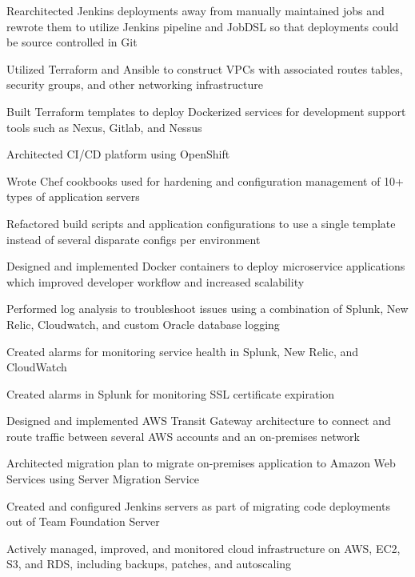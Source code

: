 \begin{cventries}
{\begin{cvitems}
        \item {Rearchitected Jenkins deployments away from manually maintained jobs and rewrote them to utilize Jenkins pipeline and JobDSL so that deployments could be source controlled in Git}
        \item {Utilized Terraform and Ansible to construct VPCs with associated routes tables, security groups, and other networking infrastructure}
        \item {Built Terraform templates to deploy Dockerized services for development support tools such as Nexus, Gitlab, and Nessus}
        \item {Architected CI/CD platform using OpenShift}
        \item {Wrote Chef cookbooks used for hardening and configuration management of 10+ types of application servers}
        \item {Refactored build scripts and application configurations to use a single template instead of several disparate configs per environment}
        \item {Designed and implemented Docker containers to deploy microservice applications which improved developer workflow and increased scalability}
        \item {Performed log analysis to troubleshoot issues using a combination of Splunk, New Relic, Cloudwatch, and custom Oracle database logging}
        \item {Created alarms for monitoring service health in Splunk, New Relic, and CloudWatch}
        \item {Created alarms in Splunk for monitoring SSL certificate expiration}
        \item {Designed and implemented AWS Transit Gateway architecture to connect and route traffic between several AWS accounts and an on-premises network}
        \item {Architected migration plan to migrate on-premises application to Amazon Web Services using Server Migration Service}
        \item {Created and configured Jenkins servers as part of migrating code deployments out of Team Foundation Server}
        \item {Actively managed, improved, and monitored cloud infrastructure on AWS, EC2, S3, and RDS, including backups, patches, and autoscaling}

\end{cvitems}}
\end{cventries}
